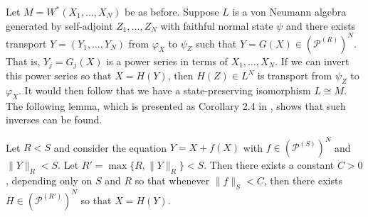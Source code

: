 Let $M=W^*(X_1,\ldots, X_N)$ be as before. Suppose $L$ is a von Neumann algebra generated by self-adjoint $Z_1,\ldots, Z_N$ with faithful normal state $\psi$ and there exists transport $Y=(Y_1,\ldots, Y_N)$  from $\varphi_X$ to $\psi_Z$ such that $Y=G(X)\in (\mathscr{P}^{(R)})^N$. That is, $Y_j=G_j(X)$ is a power series in terms of $X_1,\ldots, X_N$. If we can invert this power series so that $X=H(Y)$, then $H(Z)\in L^N$ is transport from $\psi_Z$ to $\varphi_X$. It would then follow that we have a state-preserving isomorphism $L\cong M$. The following lemma, which is presented as Corollary 2.4 in \cite{GS14}, shows that such inverses can be found.

\begin{lem}\label{invertible_power_series}
Let $R<S$ and consider the equation $Y=X+f(X)$ with $f\in (\mathscr{P}^{(S)})^N$ and $\|Y\|_{R}<S$. Let $R'=\max\{R,\|Y\|_R\}<S$. Then there exists a constant $C>0$, depending only on $S$ and $R$ so that whenever $\|f\|_S<C$, then there exists $H\in (\mathscr{P}^{(R')})^N$ so that $X=H(Y)$.
\end{lem}

